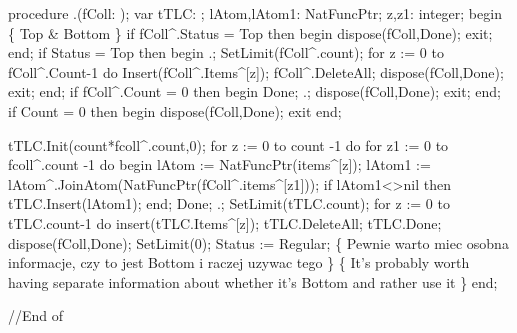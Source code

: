procedure .(fColl: );
var
   tTLC: ;
   lAtom,lAtom1: NatFuncPtr;
   z,z1: integer;
begin
   \{ Top & Bottom \}
   if fColl^.Status = Top then begin dispose(fColl,Done); exit; end;
   if Status = Top then
   begin
      .;
      SetLimit(fColl^.count);
      for z := 0 to fColl^.Count-1 do Insert(fColl^.Items^[z]);
      fColl^.DeleteAll;
      dispose(fColl,Done);
      exit;
   end;
   if fColl^.Count = 0 then
   begin
      Done;
      .;
      dispose(fColl,Done);
      exit;
   end;
   if Count = 0 then
   begin dispose(fColl,Done);
   exit
   end;

   tTLC.Init(count*fcoll^.count,0);
   for z := 0 to count -1 do
      for z1 := 0 to fcoll^.count -1 do
      begin
         lAtom := NatFuncPtr(items^[z]);
         lAtom1 := lAtom^.JoinAtom(NatFuncPtr(fColl^.items^[z1]));
         if lAtom1<>nil then tTLC.Insert(lAtom1);
      end;
   Done;
   .;
   SetLimit(tTLC.count);
   for z := 0 to tTLC.count-1 do insert(tTLC.Items^[z]);
   tTLC.DeleteAll;
   tTLC.Done;
   dispose(fColl,Done);
   SetLimit(0);
   Status := Regular;
   \{ Pewnie warto miec osobna informacje, czy to jest Bottom i raczej uzywac tego \}
   \{ It's probably worth having separate information about whether it's Bottom and rather use it \}
end;

//End of 
\eatline
{}\nwendcode{}\nwdocspar

